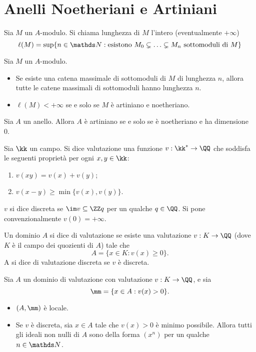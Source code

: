 \section{Anelli Noetheriani e Artiniani}

\begin{definition}
Sia $M$ un $A$-modulo. Si chiama lunghezza di $M$ l'intero (eventualmente $+\infty$)
$$
\ell(M)=\sup\{n\in\NN:\text{esistono $M_0\subsn\ldots\subsn M_n$ sottomoduli di $M$}\}
$$
\end{definition}
\begin{lemma}
Sia $M$ un $A$-modulo.
\begin{itemize}
\item Se esiste una catena massimale di sottomoduli di $M$ di lunghezza $n$, allora tutte le catene massimali di sottomoduli hanno lunghezza $n$.
\item $\ell(M)<+\infty$ se e solo se $M$ è artiniano e noetheriano.
\end{itemize}
\end{lemma}
\begin{proposition}
Sia $A$ un anello. Allora $A$ è artiniano se e solo se è noetheriano e ha dimensione 0.
\end{proposition}
\begin{definition}
Sia $\kk$ un campo. Si dice valutazione una funzione $\map{v}{\kk^*}{\QQ}$ che soddisfa le seguenti proprietà per ogni $x,y\in\kk$:
\begin{enumerate}
\item $v(xy)=v(x)+v(y)$;
\item $v(x-y)\ge\min\{v(x),v(y)\}$.
\end{enumerate}
$v$ si dice discreta se $\im v\subs\ZZ q$ per un qualche $q\in\QQ$. Si pone convenzionalmente $v(0)=+\infty$.
\end{definition}
\begin{definition}
Un dominio $A$ si dice di valutazione se esiste una valutazione $\map{v}{K}{\QQ}$ (dove $K$ è il campo dei quozienti di $A$) tale che 
$$
A=\{x\in K:v(x)\ge0\}.
$$
A si dice di valutazione discreta se $v$ è discreta.
\end{definition}
\begin{proposition}
Sia $A$ un dominio di valutazione con valutazione $\map{v}{K}{\QQ}$, e sia
$$
\mm=\{x\in A:v(x)>0\}.
$$
\begin{itemize}
\item $(A,\mm)$ è locale.
\item Se $v$ è discreta, sia $x\in A$ tale che $v(x)>0$ è minimo possibile. Allora tutti gli ideali non nulli di $A$ sono della forma $(x^n)$ per un qualche $n\in\NN$.
\end{itemize}
\end{proposition}
